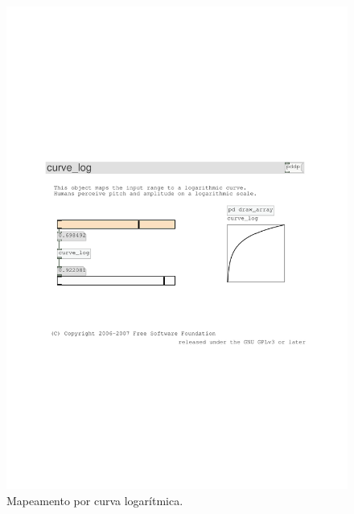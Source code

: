 \documentclass{ppgmus}
\begin{document}
\begin{figure}
\includegraphics[scale=.6]{mapping4}
\caption{Mapeamento por curva logarítmica.}
\label{mapping4}
\end{figure}
\end{document}
